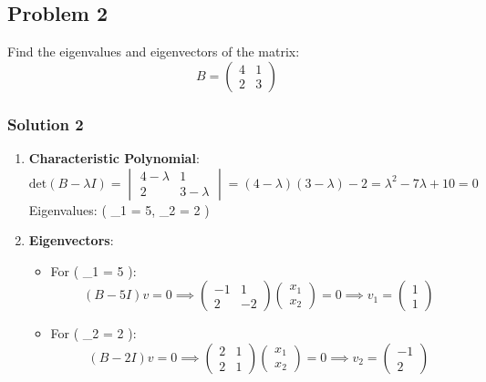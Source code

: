 \documentclass[
  letterpaper,
  DIV=11,
  numbers=noendperiod]{scrartcl}
\providecommand{\tightlist}{%
  \setlength{\itemsep}{0pt}\setlength{\parskip}{0pt}}\usepackage{longtable,booktabs,array}
\begin{document}
\subsection{Problem 2}\label{problem-2}

Find the eigenvalues and eigenvectors of the matrix: \[
B = \begin{pmatrix} 4 & 1 \\ 2 & 3 \end{pmatrix}
\]

\subsubsection{Solution 2}\label{solution-2}

\begin{enumerate}
\def\labelenumi{\arabic{enumi}.}
\item
  \textbf{Characteristic Polynomial}: \[
  \text{det}(B - \lambda I) = \begin{vmatrix} 4 - \lambda & 1 \\ 2 & 3 - \lambda \end{vmatrix} = (4 - \lambda)(3 - \lambda) - 2 = \lambda^2 - 7\lambda + 10 = 0
  \] Eigenvalues: ( \lambda\_1 = 5, \lambda\_2 = 2 )
\item
  \textbf{Eigenvectors}:

  \begin{itemize}
  \tightlist
  \item
    For ( \lambda\_1 = 5 ): \[
    (B - 5I)v = 0 \implies \begin{pmatrix} -1 & 1 \\ 2 & -2 \end{pmatrix}\begin{pmatrix} x_1 \\ x_2 \end{pmatrix} = 0 \implies v_1 = \begin{pmatrix} 1 \\ 1 \end{pmatrix}
    \]
  \item
    For ( \lambda\_2 = 2 ): \[
    (B - 2I)v = 0 \implies \begin{pmatrix} 2 & 1 \\ 2 & 1 \end{pmatrix}\begin{pmatrix} x_1 \\ x_2 \end{pmatrix} = 0 \implies v_2 = \begin{pmatrix} -1 \\ 2 \end{pmatrix}
    \]
  \end{itemize}
\end{enumerate}
\end{document}
